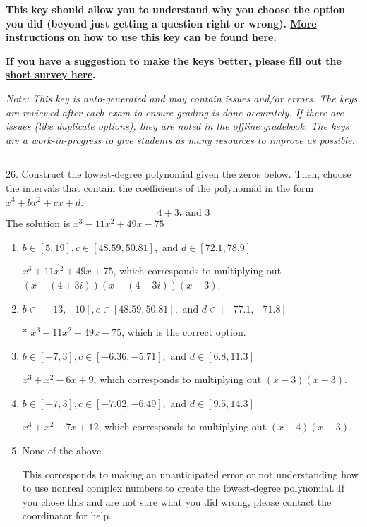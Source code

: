\documentclass{article}[14pt]
\begin{document}
\textbf{This key should allow you to understand why you choose the option you did (beyond just getting a question right or wrong). \href{https://xronos.clas.ufl.edu/mac1105spring2020/courseDescriptionAndMisc/Exams/LearningFromResults}{More instructions on how to use this key can be found here}.}

\textbf{If you have a suggestion to make the keys better, \href{https://forms.gle/CZkbZmPbC9XALEE88}{please fill out the short survey here}.}

\textit{Note: This key is auto-generated and may contain issues and/or errors. The keys are reviewed after each exam to ensure grading is done accurately. If there are issues (like duplicate options), they are noted in the offline gradebook. The keys are a work-in-progress to give students as many resources to improve as possible.}

\rule{\textwidth}{0.4pt}

26. Construct the lowest-degree polynomial given the zeros below. Then, choose the intervals that contain the coefficients of the polynomial in the form $x^3+bx^2+cx+d$.
$$ 4 + 3i \text{ and } 3 $$ 
The solution is $ x^{3} -11 x^{2} +49 x -75 $ 

\begin{enumerate}[label=\Alph*.] 
\item $ b \in [5, 19], c \in [48.59, 50.81], \text{ and } d \in [72.1, 78.9] $ 

 $x^{3} +11 x^{2} +49 x + 75$, which corresponds to multiplying out $(x-(4 + 3i))(x-(4 - 3i))(x + 3)$. 
\item $ b \in [-13, -10], c \in [48.59, 50.81], \text{ and } d \in [-77.1, -71.8] $ 

 * $x^{3} -11 x^{2} +49 x -75$, which is the correct option. 
\item $ b \in [-7, 3], c \in [-6.36, -5.71], \text{ and } d \in [6.8, 11.3] $ 

 $x^{3} + x^{2} -6 x + 9$, which corresponds to multiplying out $(x -3)(x -3)$. 
\item $ b \in [-7, 3], c \in [-7.02, -6.49], \text{ and } d \in [9.5, 14.3] $ 

 $x^{3} + x^{2} -7 x + 12$, which corresponds to multiplying out $(x -4)(x -3)$. 
\item $ \text{None of the above.} $ 

 This corresponds to making an unanticipated error or not understanding how to use nonreal complex numbers to create the lowest-degree polynomial. If you chose this and are not sure what you did wrong, please contact the coordinator for help. 
\end{enumerate} 
 
\end{document}
